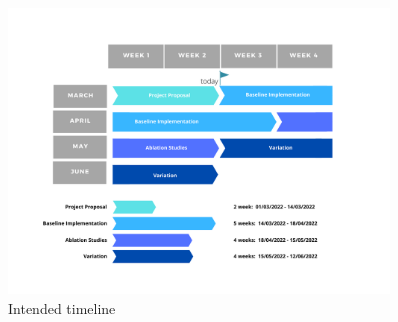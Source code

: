 \documentclass{article}
\begin{document}
\begin{figure}[h]
\includegraphics[width=0.9\textwidth, angle=0]{assets/timeline.pdf}
\caption{Intended timeline}
\end{figure}


\newpage
\printbibliography
\end{document}
